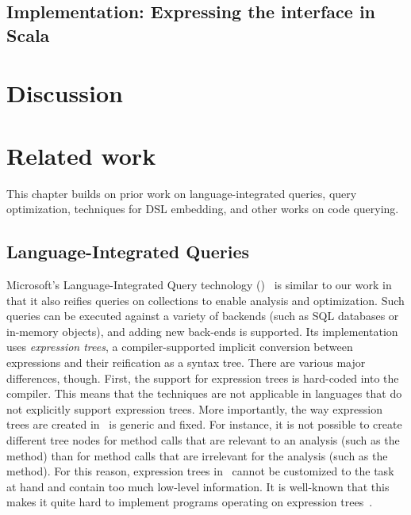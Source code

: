 

\section{Implementation: Expressing the interface in Scala}
\label{ch:aosd13-intfScala}
\label{sec:intfScala}





\chapter{Discussion}
\label{ch:aosd13-discussion}
\label{sec:discussion}


\chapter{Related work}
\label{ch:aosd13-relwork}
\label{sec:relwork}
This chapter builds on prior work on language-integrated queries, query optimization, techniques for DSL embedding, and other works on code querying.

\section{Language-Integrated Queries}
Microsoft's Language-Integrated Query technology (\LINQ)~\citep{Meijer:2006:LRO:1142473.1142552,Bierman:2007:LTF:1297027.1297063} is similar to our work in that it also
reifies queries on collections to enable analysis and optimization. Such queries can be executed against a variety of backends (such as SQL databases or in-memory objects), and adding new back-ends is supported. Its implementation uses \emph{expression trees}, a compiler-supported
implicit conversion between expressions and their reification as a syntax tree. There are various major differences, though.
First, the support for expression trees is hard-coded into the compiler. This means that the techniques are not applicable in languages 
that do not explicitly support expression trees. More importantly, the way expression trees are created in \LINQ\ is generic and fixed.
For instance, it is not possible to create different tree nodes for method calls that are relevant to an analysis (such as the  method) than for method calls that are irrelevant for the analysis (such as the  method). For this reason, expression trees in \LINQ\ 
cannot be customized to the task at hand and contain too much low-level information. It is well-known that this makes it quite hard to
implement programs operating on expression trees~\citep{Eini11Pain}. 

